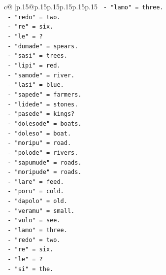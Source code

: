 \documentclass{article}
\begin{document}
{\begin{supertabular}{c@{$\;$}|p{.15\linewidth}@{}p{.15\linewidth}p{.15\linewidth}p{.15\linewidth}p{.15\linewidth}p{.15\linewidth}}
{{{\texttt{                        {-} "lamo" = three.} \\
\texttt{                        {-} "redo" = two.} \\
\texttt{                        {-} "re" = six.} \\
\texttt{                        {-} "le" = ?} \\
\texttt{                        {-} "dumade" = spears.} \\
\texttt{                        {-} "sasi" = trees.} \\
\texttt{                        {-} "lipi" = red.} \\
\texttt{                        {-} "samode" = river.} \\
\texttt{                        {-} "lasi" = blue.} \\
\texttt{                        {-} "sapede" = farmers.} \\
\texttt{                        {-} "lidede" = stones.} \\
\texttt{                        {-} "pasede" = kings?} \\
\texttt{                        {-} "dolesode" = boats.} \\
\texttt{                        {-} "doleso" = boat.} \\
\texttt{                        {-} "moripu" = road.} \\
\texttt{                        {-} "polode" = rivers.} \\
\texttt{                        {-} "sapumude" = roads.} \\
\texttt{                        {-} "moripude" = roads.} \\
\texttt{                        {-} "lare" = feed.} \\
\texttt{                        {-} "poru" = cold.} \\
\texttt{                        {-} "dapolo" = old.} \\
\texttt{                        {-} "veramu" = small.} \\
\texttt{                        {-} "vulo" = see.} \\
\texttt{                        {-} "lamo" = three.} \\
\texttt{                        {-} "redo" = two.} \\
\texttt{                        {-} "re" = six.} \\
\texttt{                        {-} "le" = ?} \\
\texttt{                        {-} "si" = the.} \\
}}}
\end{supertabular}}
\end{document}
